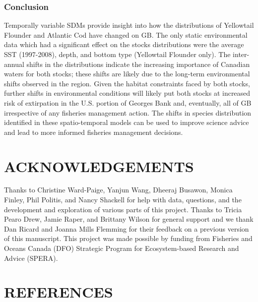 \documentclass[
]{article}
\begin{document}
\hypertarget{conclusion}{%
\subsubsection{Conclusion}\label{conclusion}}

Temporally variable SDMs provide insight into how the distributions of Yellowtail Flounder and Atlantic Cod have changed on GB. The only static environmental data which had a significant effect on the stocks distributions were the average SST (1997-2008), depth, and bottom type (Yellowtail Flounder only). The inter-annual shifts in the distributions indicate the increasing importance of Canadian waters for both stocks; these shifts are likely due to the long-term environmental shifts observed in the region. Given the habitat constraints faced by both stocks, further shifts in environmental conditions will likely put both stocks at increased risk of extirpation in the U.S. portion of Georges Bank and, eventually, all of GB irrespective of any fisheries management action. The shifts in species distribution identified in these spatio-temporal models can be used to improve science advice and lead to more informed fisheries management decisions.

\hypertarget{acknowledgements}{%
\section{ACKNOWLEDGEMENTS}\label{acknowledgements}}

Thanks to Christine Ward-Paige, Yanjun Wang, Dheeraj Busawon, Monica Finley, Phil Politis, and Nancy Shackell for help with data, questions, and the development and exploration of various parts of this project. Thanks to Tricia Pearo Drew, Jamie Raper, and Brittany Wilson for general support and we thank Dan Ricard and Joanna Mills Flemming for their feedback on a previous version of this manuscript. This project was made possible by funding from Fisheries and Oceans Canada (DFO) Strategic Program for Ecosystem-based Research and Advice (SPERA).

\clearpage

\newpage

\hypertarget{references}{%
\section*{REFERENCES}\label{references}}
\end{document}
